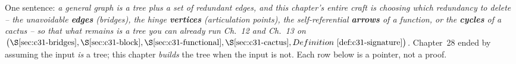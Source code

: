 

One sentence: \emph{a general graph is a tree plus a set of redundant edges, and this
chapter's entire craft is choosing which redundancy to delete -- the unavoidable
\textbf{edges} (bridges), the hinge \textbf{vertices} (articulation points), the
self-referential \textbf{arrows} of a function, or the \textbf{cycles} of a cactus --
so that what remains is a tree you can already run Ch.~12 and Ch.~13 on
\(\bigl(\secref{c31-bridges}, \secref{c31-block}, \secref{c31-functional},
\secref{c31-cactus}, \defref{c31-signature}\bigr)\).}  Chapter~28 ended by assuming the
input \emph{is} a tree; this chapter \emph{builds} the tree when the input is not.  Each
row below is a pointer, not a proof.

